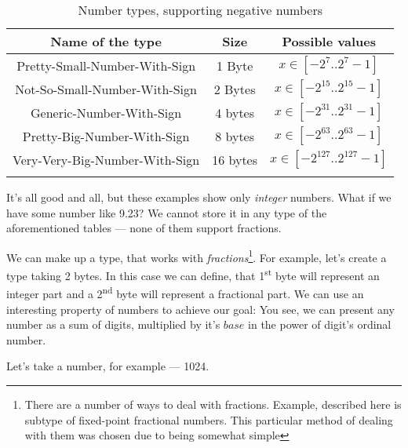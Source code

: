 \documentclass[../../what-is-computer.tex]{subfiles}
\begin{document}
    \begin{table}[H]
        \centering
        \begin{longtable}{|c|c|c|}
            \hline
            Name of the type & Size & Possible values \\\hline
            Pretty-Small-Number-With-Sign & 1 Byte & $x \in [-2^7..2^7 - 1]$ \\\hline
            Not-So-Small-Number-With-Sign & 2 Bytes & $x \in [-2^{15}..2^{15} - 1]$\\\hline
            Generic-Number-With-Sign & 4 bytes & $x \in [-2^{31}..2^{31} - 1]$\\\hline
            Pretty-Big-Number-With-Sign & 8 bytes & $x \in [-2^{63}..2^{63} - 1]$\\\hline
            Very-Very-Big-Number-With-Sign & 16 bytes & $x \in [-2^{127}..2^{127} - 1]$\\\hline
            \caption{Number types, supporting negative numbers}

        \end{longtable}
    \end{table}

    It's all good and all, but these examples show only \emph{integer} numbers. What if we have some number like 9.23?
    We cannot store it in any type of the aforementioned tables --- none of them support fractions. \par

    We can make up a type, that works with \emph{fractions}\footnote{There are a number of ways to deal with fractions. 
    Example, described here is subtype of fixed-point fractional numbers. This particular method of dealing with them was chosen due to being somewhat simple}. 
    For example, let's create a type taking 2 bytes. In this case we can define, that 1\textsuperscript{st} byte will represent an integer part and a 2\textsuperscript{nd}
    byte will represent a fractional part. We can use an interesting property of numbers to achieve our goal: You see, we can present any number as a sum of digits,
    multiplied by it's \emph{$base$} in the power of digit's ordinal number. \par

    Let's take a number, for example --- 1024. 
\end{document}
